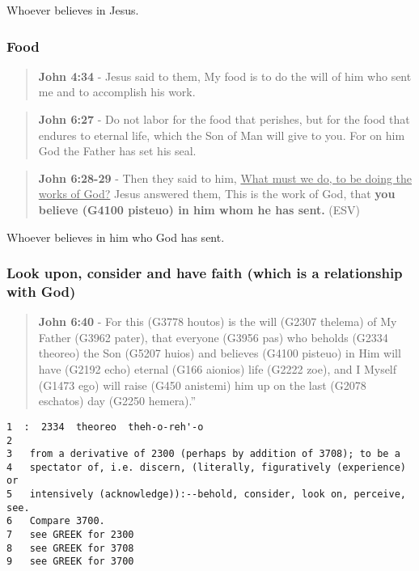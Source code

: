 \documentclass[11pt]{article}
\begin{document}
Whoever believes in Jesus.

\subsubsection{Food}
\label{sec:org23bf739}
\begin{quote}
\textbf{John 4:34} - Jesus said to them, My food is to do the will of him who sent me and to accomplish his work.
\end{quote}

\begin{quote}
\textbf{John 6:27} - Do not labor for the food that perishes, but for the food that endures to eternal life, which the Son of Man will give to you. For on him God the Father has set his seal.
\end{quote}

\begin{quote}
\textbf{John 6:28-29} - Then they said to him, \uline{What must we do, to be doing the works of God?} Jesus answered them, This is the work of God, that \textbf{you believe (G4100 pisteuo) in him whom he has sent.} (ESV)
\end{quote}

Whoever believes in him who God has sent.

\subsubsection{Look upon, consider and have faith (which is a relationship with God)}
\label{sec:org687b5ae}
\begin{quote}
\textbf{John 6:40} - For this (G3778 houtos) is the will (G2307 thelema) of My Father (G3962 pater), that everyone (G3956 pas) who beholds (G2334 theoreo) the Son (G5207 huios) and believes (G4100 pisteuo) in Him will have (G2192 echo) eternal (G166 aionios) life (G2222 zoe), and I Myself (G1473 ego) will raise (G450 anistemi) him up on the last (G2078 eschatos) day (G2250 hemera).”
\end{quote}

\begin{verbatim}
1  :  2334  theoreo  theh-o-reh'-o
2  
3   from a derivative of 2300 (perhaps by addition of 3708); to be a
4   spectator of, i.e. discern, (literally, figuratively (experience) or
5   intensively (acknowledge)):--behold, consider, look on, perceive, see.
6   Compare 3700.
7   see GREEK for 2300
8   see GREEK for 3708
9   see GREEK for 3700
\end{verbatim}
\end{document}
